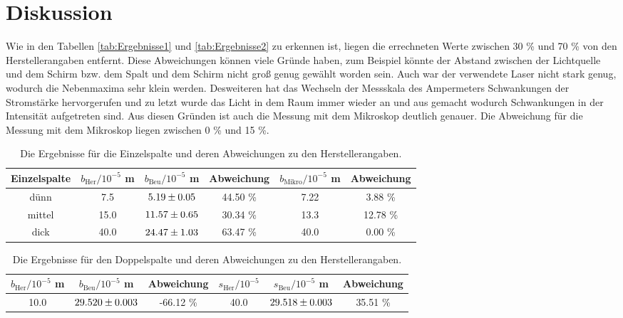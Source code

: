 \section{Diskussion}
\label{sec:Diskussion}
Wie in den Tabellen \eqref{tab:Ergebnisse1} und \eqref{tab:Ergebnisse2} zu erkennen ist, liegen die errechneten Werte zwischen 30 \% und 70 \% von den Herstellerangaben entfernt. Diese Abweichungen können viele Gründe haben, zum Beispiel könnte der Abstand zwischen der Lichtquelle und dem Schirm bzw. dem Spalt und dem Schirm nicht groß genug gewählt worden sein. Auch war der verwendete Laser nicht stark genug, wodurch die Nebenmaxima sehr klein werden. Desweiteren hat das Wechseln der Messskala des Ampermeters Schwankungen der Stromstärke hervorgerufen und zu letzt wurde das Licht in dem Raum immer wieder an und aus gemacht wodurch Schwankungen in der Intensität aufgetreten sind. Aus diesen Gründen ist auch die Messung mit dem Mikroskop deutlich genauer. Die Abweichung für die Messung mit dem Mikroskop liegen zwischen 0 \% und 15 \%.

\begin{table}[H] %
  \centering
  \begin{tabular}{c || c || c | c || c | c}
    \toprule
    Einzelspalte & $b_\text{Her} / 10^{-5}$ m & $b_\text{Beu} / 10^{-5}$ m & Abweichung & $b_\text{Mikro} / 10^{-5}$ m & Abweichung \\
    \midrule
    dünn & 7.5 & $\num{5.19 +- 0.05}$ & 44.50 \% & 7.22 & 3.88 \% \\
    mittel & 15.0 & $\num{11.57 +- 0.65}$ & 30.34 \% & 13.3 & 12.78 \% \\
    dick & 40.0 & $\num{24.47 +- 1.03}$ & 63.47 \% & 40.0 & 0.00 \% \\
    \bottomrule
  \end{tabular}
  \caption{Die Ergebnisse für die Einzelspalte und deren Abweichungen zu den Herstellerangaben.}
  \label{tab:Ergebnisse1}
\end{table}

\begin{table}[H]%
  \centering
  \begin{tabular}{c | c | c || c | c | c}
    \toprule
    $b_\text{Her} / 10^{-5}$ m & $b_\text{Beu} / 10^{-5}$ m & Abweichung & $s_\text{Her} / 10^{-5}$ & $s_\text{Beu} / 10^{-5}$ m & Abweichung \\
    \midrule
    10.0 & $\num{29.520 +- 0.003}$ & -66.12 \% & 40.0 & $\num{29.518 +- 0.003}$ & 35.51 \% \\
    \bottomrule
  \end{tabular}
  \caption{Die Ergebnisse für den Doppelspalte und deren Abweichungen zu den Herstellerangaben.}
  \label{tab:Ergebnisse2}
\end{table}
